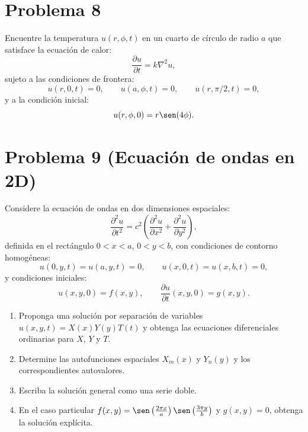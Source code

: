 \documentclass[12pt]{article}
\begin{document}
\section*{Problema 8}
Encuentre la temperatura \(u(r, \phi, t)\) en un cuarto de círculo de radio \(a\) que satisface la ecuación de calor:
\[
\frac{\partial u}{\partial t} = k \nabla^2 u,
\]
sujeto a las condiciones de frontera:
\[
u(r, 0, t) = 0, \qquad u(a, \phi, t) = 0, \qquad u(r, \pi/2, t) = 0,
\]
y a la condición inicial:
\[
u(r, \phi, 0) = r \sen(4\phi).
\]

\section*{Problema 9 (Ecuación de ondas en 2D)}
Considere la ecuación de ondas en dos dimensiones espaciales:
\[
\frac{\partial^2 u}{\partial t^2} = c^2 \left( \frac{\partial^2 u}{\partial x^2} + \frac{\partial^2 u}{\partial y^2} \right),
\]
definida en el rectángulo \(0 < x < a\), \(0 < y < b\), con condiciones de contorno homogéneas:
\[
u(0, y, t) = u(a, y, t) = 0, \qquad u(x, 0, t) = u(x, b, t) = 0,
\]
y condiciones iniciales:
\[
u(x, y, 0) = f(x, y), \qquad \frac{\partial u}{\partial t}(x, y, 0) = g(x, y).
\]
\begin{enumerate}
    \item[(a)] Proponga una solución por separación de variables \(u(x,y,t) = X(x)Y(y)T(t)\) y obtenga las ecuaciones diferenciales ordinarias para \(X\), \(Y\) y \(T\).
    \item[(b)] Determine las autofunciones espaciales \(X_m(x)\) y \(Y_n(y)\) y los correspondientes autovalores.
    \item[(c)] Escriba la solución general como una serie doble.
    \item[(d)] En el caso particular \(f(x,y) = \sen\left(\frac{2\pi x}{a}\right) \sen\left(\frac{3\pi y}{b}\right)\) y \(g(x,y) = 0\), obtenga la solución explícita.
\end{enumerate}
\end{document}
